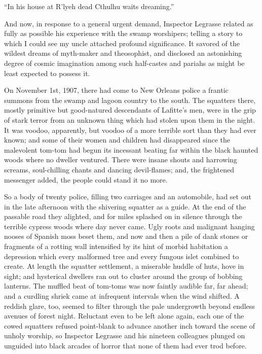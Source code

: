 \beginblockquote
“In his house at R’lyeh dead Cthulhu waits dreaming.”
\endblockquote

\sectionbreak

And now, in response to a general urgent demand, Inspector Legrasse related as fully as possible his experience with the swamp worshipers; telling a story to which I could see my uncle attached profound significance. It savored of the wildest dreams of myth-maker and theosophist, and disclosed an astonishing degree of cosmic imagination among such half-castes and pariahs as might be least expected to possess it.

On November 1st, 1907, there had come to New Orleans police a frantic summons from the swamp and lagoon country to the south. The squatters there, mostly primitive but good-natured descendants of Lafitte’s men, were in the grip of stark terror from an unknown thing which had stolen upon them in the night. It was voodoo, apparently, but voodoo of a more terrible sort than they had ever known; and some of their women and children had disappeared since the malevolent tom-tom had begun its incessant beating far within the black haunted woods where no dweller ventured. There were insane shouts and harrowing screams, soul-chilling chants and dancing devil-flames; and, the frightened messenger added, the people could stand it no more.

So a body of twenty police, filling two carriages and an automobile, had set out in the late afternoon with the shivering squatter as a guide. At the end of the passable road they alighted, and for miles splashed on in silence through the terrible cypress woods where day never came. Ugly roots and malignant hanging nooses of Spanish moss beset them, and now and then a pile of dank stones or fragments of a rotting wall intensified by its hint of morbid habitation a depression which every malformed tree and every fungous islet combined to create. At length the squatter settlement, a miserable huddle of huts, hove in sight; and hysterical dwellers ran out to cluster around the group of bobbing lanterns. The muffled beat of tom-toms was now faintly audible far, far ahead; and a curdling shriek came at infrequent intervals when the wind shifted. A reddish glare, too, seemed to filter through the pale undergrowth beyond endless avenues of forest night. Reluctant even to be left alone again, each one of the cowed squatters refused point-blank to advance another inch toward the scene of unholy worship, so Inspector Legrasse and his nineteen colleagues plunged on unguided into black arcades of horror that none of them had ever trod before.

